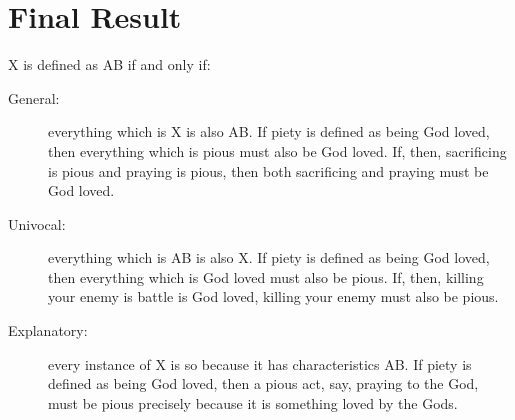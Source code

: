 \documentclass[oneside]{article}
\begin{document}





\section*{Final Result}
 X is defined as AB if and only if: 
\begin{description}
\item[General:] everything which is X is also AB. If piety is defined as being God loved, then everything which is pious must also be God loved. If, then, sacrificing is pious and praying is pious, then both sacrificing and praying must be God loved. 
\item[Univocal:] everything which is AB is also X. If piety is defined as being God loved, then everything which is God loved must also be pious. If, then, killing your enemy is battle is God loved, killing your enemy must also be pious. 
\item[Explanatory:]  every instance of X is so because it has characteristics AB. If piety is defined as being God loved, then a pious act, say, praying to the God, must be pious precisely because it is something loved by the Gods. 
\end{description}
\end{document}
